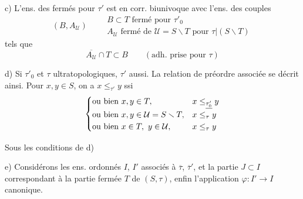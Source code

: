 \documentclass[11pt,a4paper]{article}
\begin{document}

c) L'ens. des fermés pour $\tau'$ est en corr. biunivoque avec l'ens. des couples
\[
  (B, A_{\mathcal{U}}) \qquad
  \begin{array}{l}
    B \subset T \text{ fermé pour } \tau'_0 \\
    A_{\mathcal{U}} \text{ fermé de } \mathcal{U} = S \smallsetminus T \text{ pour } \tau|(S \smallsetminus T)
  \end{array}
\]
tels que
\[
  \overline{A_{\mathcal{U}}} \cap T \subset B \qquad (\text{adh. prise pour } \tau)
\]

d) Si $\tau'_0$ et $\tau$ ultratopologiques, $\tau'$ aussi. La relation de préordre associée  se décrit ainsi. Pour $x, y \in S$, on a $x \leq_{\tau'} y$ ssi
\[
  \begin{cases}
    \text{ou bien } x, y \in T, & x \leq_{\uncertain{\tau'_0}} y \\
    \text{ou bien } x, y \in \mathcal{U} = S \smallsetminus T, & x \leq_{\tau} y \\
    \text{ou bien } x \in T,\ y \in \mathcal{U}, & x \leq_{\tau} y
  \end{cases}
\]

Sous les conditions de d)

e) Considérons les ens. ordonnés $I$, $I'$ associés à $\overline{\tau}$, $\overline{\tau}'$, et la partie  $J \subset I$ correspondant à la partie fermée $T$ de $(S, \tau)$, enfin l'application $\varphi : I' \to I$ canonique.


\end{document}
